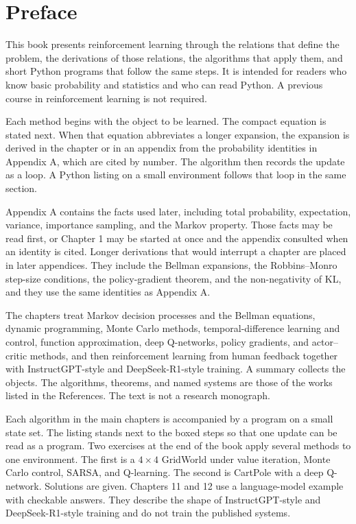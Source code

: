 \chapter{Preface}

This book presents reinforcement learning through the relations that define the problem, the derivations of those relations, the algorithms that apply them, and short Python programs that follow the same steps. It is intended for readers who know basic probability and statistics and who can read Python. A previous course in reinforcement learning is not required.

Each method begins with the object to be learned. The compact equation is stated next. When that equation abbreviates a longer expansion, the expansion is derived in the chapter or in an appendix from the probability identities in Appendix A, which are cited by number. The algorithm then records the update as a loop. A Python listing on a small environment follows that loop in the same section.

Appendix A contains the facts used later, including total probability, expectation, variance, importance sampling, and the Markov property. Those facts may be read first, or Chapter 1 may be started at once and the appendix consulted when an identity is cited. Longer derivations that would interrupt a chapter are placed in later appendices. They include the Bellman expansions, the Robbins--Monro step-size conditions, the policy-gradient theorem, and the non-negativity of KL, and they use the same identities as Appendix A.

The chapters treat Markov decision processes and the Bellman equations, dynamic programming, Monte Carlo methods, temporal-difference learning and control, function approximation, deep Q-networks, policy gradients, and actor--critic methods, and then reinforcement learning from human feedback together with InstructGPT-style and DeepSeek-R1-style training. A summary collects the objects. The algorithms, theorems, and named systems are those of the works listed in the References. The text is not a research monograph.

Each algorithm in the main chapters is accompanied by a program on a small state set. The listing stands next to the boxed steps so that one update can be read as a program. Two exercises at the end of the book apply several methods to one environment. The first is a $4\times 4$ GridWorld under value iteration, Monte Carlo control, SARSA, and Q-learning. The second is CartPole with a deep Q-network. Solutions are given. Chapters 11 and 12 use a language-model example with checkable answers. They describe the shape of InstructGPT-style and DeepSeek-R1-style training and do not train the published systems.
